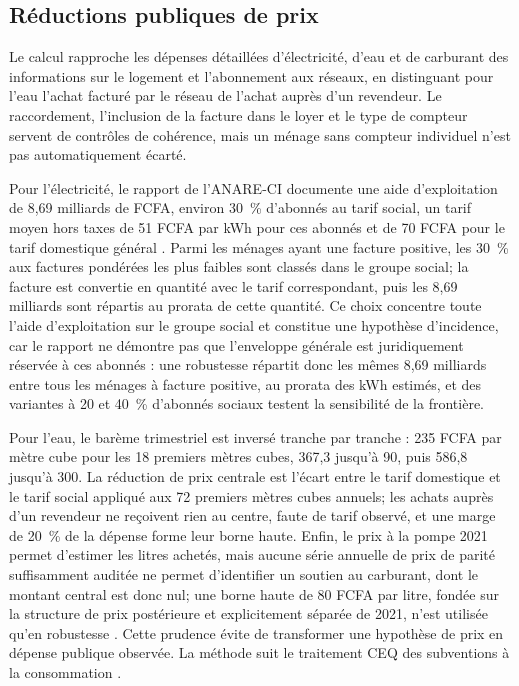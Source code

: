 \documentclass[11pt,a4paper]{article}
\begin{document}
\subsection{Réductions publiques de prix}

Le calcul rapproche les dépenses détaillées d'électricité, d'eau et de carburant
des informations sur le logement et l'abonnement aux réseaux, en distinguant
pour l'eau l'achat facturé par le réseau de l'achat auprès d'un revendeur. Le
raccordement, l'inclusion de la facture dans le loyer et le type de compteur
servent de contrôles de cohérence, mais un ménage sans compteur individuel n'est
pas automatiquement écarté.

Pour l'électricité, le rapport de l'ANARE-CI documente une aide d'exploitation
de 8,69 milliards de FCFA, environ 30~\% d'abonnés au tarif social, un tarif
moyen hors taxes de 51 FCFA par kWh pour ces abonnés et de 70 FCFA pour le tarif
domestique général \citep{anare2021}. Parmi les ménages ayant une facture
positive, les 30~\% aux factures pondérées les plus faibles sont classés dans le
groupe social; la facture est convertie en quantité avec le tarif correspondant,
puis les 8,69 milliards sont répartis au prorata de cette quantité. Ce choix
concentre toute l'aide d'exploitation sur le groupe social et constitue une
hypothèse d'incidence, car le rapport ne démontre pas que l'enveloppe générale
est juridiquement réservée à ces abonnés : une robustesse répartit donc les
mêmes 8,69 milliards entre tous les ménages à facture positive, au prorata des
kWh estimés, et des variantes à 20 et 40~\% d'abonnés sociaux testent la
sensibilité de la frontière.

Pour l'eau, le barème trimestriel est inversé tranche par tranche : 235 FCFA par
mètre cube pour les 18 premiers mètres cubes, 367,3 jusqu'à 90, puis 586,8
jusqu'à 300. La réduction de prix centrale est l'écart entre le tarif domestique
et le tarif social appliqué aux 72 premiers mètres cubes annuels; les achats
auprès d'un revendeur ne reçoivent rien au centre, faute de tarif observé, et
une marge de 20~\% de la dépense forme leur borne haute. Enfin, le prix à la
pompe 2021 permet d'estimer les litres achetés, mais aucune série annuelle de
prix de parité suffisamment auditée ne permet d'identifier un soutien au
carburant, dont le montant central est donc nul; une borne haute de 80 FCFA par
litre, fondée sur la structure de prix postérieure et explicitement séparée de
2021, n'est utilisée qu'en robustesse \citep{bceao2023}. Cette prudence évite de
transformer une hypothèse de prix en dépense publique observée. La méthode suit
le traitement CEQ des subventions à la consommation \citep{lustig2022,younger2017}.
\end{document}
